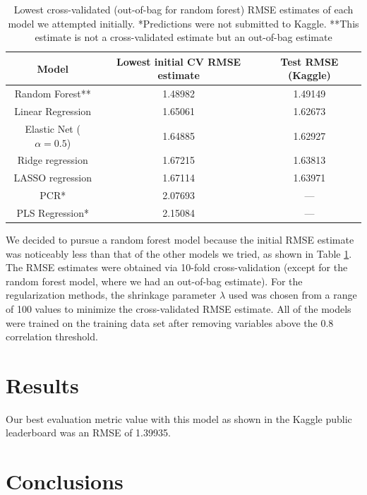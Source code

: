 \documentclass{scrartcl}
\begin{document}
\begin{table}
    \centering
    \begin{tabular}{| c | c | c |}
         \hline
         Model & Lowest initial CV RMSE estimate & Test RMSE (Kaggle)\\
         \hline
         Random Forest** & 1.48982 & 1.49149\\
         \hline
         Linear Regression & 1.65061 & 1.62673\\
         \hline
         Elastic Net (\(\alpha=0.5\)) & 1.64885 & 1.62927\\
         \hline
         Ridge regression & 1.67215 & 1.63813\\
         \hline
         LASSO regression & 1.67114 & 1.63971\\
         \hline
         PCR* & 2.07693 & ---\\
         \hline
         PLS Regression* & 2.15084 & ---\\
         \hline
    \end{tabular}
    \caption{Lowest cross-validated (out-of-bag for random forest) RMSE estimates of each model we attempted initially. *Predictions were not submitted to Kaggle. **This estimate is not a cross-validated estimate but an out-of-bag estimate}
    \label{table:others}
\end{table}

We decided to pursue a random forest model because the initial RMSE estimate was noticeably less than that of the other models we tried, as shown in Table \ref{table:others}. The RMSE estimates were obtained via 10-fold cross-validation (except for the random forest model, where we had an out-of-bag estimate). For the regularization methods, the shrinkage parameter \(\lambda\) used was chosen from a range of 100 values to minimize the cross-validated RMSE estimate. All of the models were trained on the training data set after removing variables above the 0.8 correlation threshold.

\section{Results}

Our best evaluation metric value with this model as shown in the Kaggle public leaderboard was an RMSE of 1.39935.

\section{Conclusions}
\end{document}
